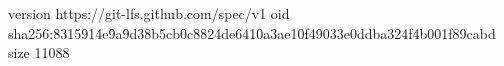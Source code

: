 version https://git-lfs.github.com/spec/v1
oid sha256:8315914e9a9d38b5cb0c8824de6410a3ae10f49033e0ddba324f4b001f89cabd
size 11088
